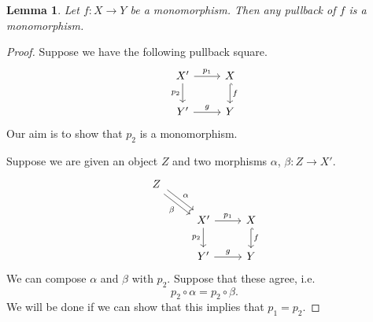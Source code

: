 \documentclass[a4paper,10pt]{scrreprt}
\theoremstyle{definition}
\theoremstyle{plain}
\newtheorem{lemma}{Lemma}[section]
\theoremstyle{remark}
\begin{document}
\begin{lemma}
  Let $f\colon X \to Y$ be a monomorphism. Then any pullback of $f$ is a monomorphism.
\end{lemma}
\begin{proof}
  Suppose we have the following pullback square.
  \begin{equation*}
    \begin{tikzcd}
      X'
      \arrow[r, "p_{1}"]
      \arrow[d, swap, "p_{2}"]
      & X
      \arrow[d, hookrightarrow, "f"]
      \\
      Y'
      \arrow[r, "g"]
      & Y
    \end{tikzcd}
  \end{equation*}
  Our aim is to show that $p_{2}$ is a monomorphism.

  Suppose we are given an object $Z$ and two morphisms $\alpha$, $\beta\colon Z \to X'$.
  \begin{equation*}
    \begin{tikzcd}
      Z
      \arrow[dr, shift left, "\alpha"]
      \arrow[dr, shift right, swap, "\beta"]
      \\
      & X'
      \arrow[r, "p_{1}"]
      \arrow[d, swap, "p_{2}"]
      & X
      \arrow[d, hookrightarrow, "f"]
      \\
      & Y'
      \arrow[r, "g"]
      & Y
    \end{tikzcd}
  \end{equation*}
  We can compose $\alpha$ and $\beta$ with $p_{2}$. Suppose that these agree, i.e.
  \begin{equation*}
    p_{2} \circ \alpha = p_{2} \circ \beta.
  \end{equation*}
  We will be done if we can show that this implies that $p_{1} = p_{2}$.


\end{proof}
\end{document}
